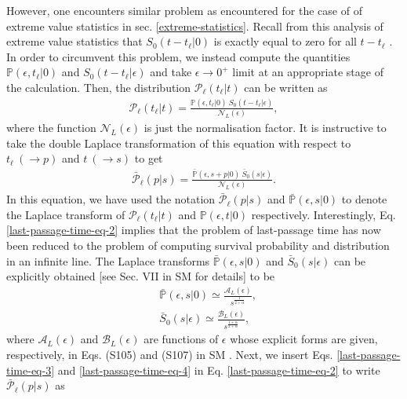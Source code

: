 \documentclass[showpacs,amsmath,amssymb,aps,pre,twocolumn,]{revtex4-1}
\begin{document}
However, one encounters similar problem as encountered for the case of of extreme value statistics in sec. \ref{extreme-statistics}. Recall from this analysis of extreme value statistics that $S_0(t-t_{\ell}|0)$ is exactly equal to zero for all $t-t_{\ell}$ . In order to circumvent this problem, we instead compute the quantities $\mathbb{P}(\epsilon, t_{\ell}|0)$ and $S_0(t-t_{\ell}|\epsilon)$ and take $\epsilon \to 0^+$ limit at an appropriate stage of the calculation. Then, the distribution $\mathcal{P}_{ \ell } \left( t_{\ell}|t \right)$ can be written as
\begin{align}
\mathcal{P}_{ \ell } \left( t_{\ell}|t \right) = \frac{\mathbb{P}(\epsilon, t_{\ell}|0)~S_0(t-t_{\ell}|\epsilon)}{\mathcal{N}_L(\epsilon)},
\label{last-passage-time-eq-1}
\end{align}
where the function $\mathcal{N}_L(\epsilon)$ is just the normalisation factor. It is instructive to take the double Laplace transformation of this equation with respect to $t_{\ell}~(\to p)$ and $t~(\to s)$ to get
\begin{align}
\bar{\mathcal{P}}_{ \ell } \left( p|s \right) = \frac{\bar{\mathbb{P}}(\epsilon, s+p|0)~\bar{S}_0(s|\epsilon)}{\mathcal{N}_L(\epsilon)}. 
\label{last-passage-time-eq-2}
\end{align}
In this equation, we have used the notation $\bar{\mathcal{P}}_{ \ell } \left( p|s \right)$ and $\bar{\mathbb{P}}(\epsilon, s|0)$ to denote the Laplace transform of $\mathcal{P}_{ \ell } \left( t_{\ell}|t \right)$ and $\mathbb{P}(\epsilon, t|0)$ respectively. Interestingly, Eq. \eqref{last-passage-time-eq-2} implies that the problem of last-passage time has now been reduced to the problem of computing survival probability and distribution in an infinite line. The Laplace transforms $\bar{\mathbb{P}}(\epsilon, s|0)$ and $\bar{S}_0(s|\epsilon)$ can be explicitly obtained [see Sec. VII in SM \cite{Supplementary} for details] to be
\begin{align}
& \bar{\mathbb{P}}(\epsilon, s|0) \simeq \frac{\mathcal{A}_L (\epsilon)}{s^{\frac{1}{2+\alpha}}}, \label{last-passage-time-eq-3} \\
& \bar{S}_0(s|\epsilon) \simeq\frac{\mathcal{B}_L (\epsilon)}{s^{\frac{1+\alpha}{2+\alpha}}}, \label{last-passage-time-eq-4}
\end{align} 
where $\mathcal{A}_L (\epsilon)$ and $\mathcal{B}_L (\epsilon)$ are functions of $\epsilon$ whose explicit forms are given, respectively, in Eqs. (S105) and (S107) in SM \cite{Supplementary}. Next, we insert Eqs. \eqref{last-passage-time-eq-3} and \eqref{last-passage-time-eq-4} in Eq. \eqref{last-passage-time-eq-2} to write $\bar{\mathcal{P}}_{ \ell } \left( p|s \right)$ as
\end{document}
